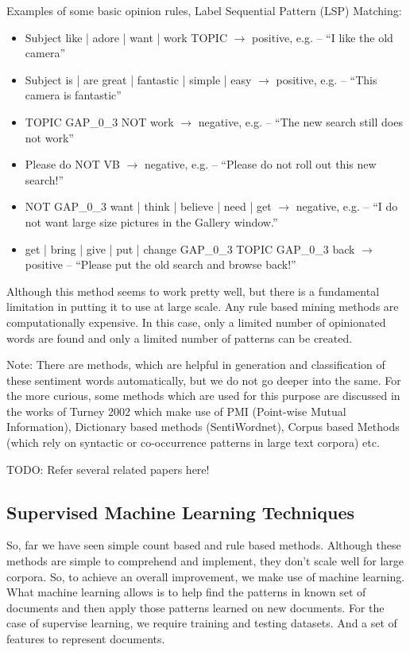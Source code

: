Examples of some basic opinion rules, Label Sequential Pattern (LSP) Matching:
\begin{itemize}
\item Subject {like | adore | want | work} TOPIC $\rightarrow$ positive, e.g. – ``I like the old camera”
\item Subject {is | are} {great | fantastic | simple | easy} $\rightarrow$ positive, e.g. – ``This camera is fantastic”
\item TOPIC GAP\_0\_3 NOT work $\rightarrow$ negative, e.g. – ``The new search still does not work”
\item Please do NOT VB $\rightarrow$ negative, e.g. – ``Please do not roll out this new search!”
\item NOT GAP\_0\_3 {want | think | believe | need | get} $\rightarrow$ negative, e.g. – ``I do not want large size pictures in the Gallery window.”
\item {get | bring | give | put | change} GAP\_0\_3 TOPIC GAP\_0\_3 back $\rightarrow$ positive
– ``Please put the old search and browse back!”
\end{itemize} 

Although this method seems to work pretty well, but there is a fundamental limitation in putting it to use at large scale. Any rule based mining methods are computationally expensive. In this case, only a limited number of opinionated words are found and only a limited number of patterns can be created. 

Note: There are methods, which are helpful in generation and classification of these sentiment words automatically, but we do not go deeper into the same. For the more curious, some methods which are used for this purpose are discussed in the works of Turney 2002 which make use of PMI (Point-wise Mutual Information), Dictionary based methods (SentiWordnet), Corpus based Methods (which rely on syntactic or co-occurrence patterns in large text corpora) etc. 

TODO: Refer several related papers here! 

\subsection{Supervised Machine Learning Techniques}
So, far we have seen simple count based and rule based methods. Although these methods are simple to comprehend and implement,  they don't scale well for large corpora. So, to achieve an overall improvement, we make use of machine learning. What machine learning allows is to help find the patterns in known set of documents and then apply those patterns learned on new documents. For the case of supervise learning, we require training and testing datasets. And a set of features to represent documents. 
\newline

